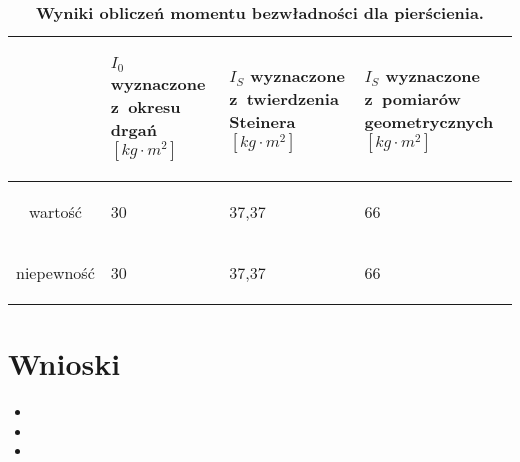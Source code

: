 \documentclass[a4paper,11pt]{article}
\begin{document}
\begin{table}[ht]
\centering
\caption{\textbf{Wyniki obliczeń momentu bezwładności dla pierścienia.}}
\begin{tabular}{|c|m{30mm}|m{30mm}|m{30mm}|}
\hline
& \begin{center}
\textbf{$I_{0}$ wyznaczone z~okresu drgań $[kg\cdot m^{2}]$}
\end{center} & \begin{center}
\textbf{$I_{S}$ wyznaczone z~twierdzenia Steinera $[kg\cdot m^{2}]$}
\end{center} & \begin{center}
\textbf{$I_{S}$ wyznaczone z~pomiarów geometrycznych $[kg\cdot m^{2}]$}
\end{center}  \\ \hline
wartość & \begin{center}30\end{center} & \begin{center}37,37\end{center} & \begin{center}66\end{center}\\ \hline
niepewność &\begin{center}30\end{center} & \begin{center}37,37\end{center} & \begin{center}66\end{center}\\ \hline

\end{tabular}
\end{table}



\section{Wnioski}
\begin{itemize}
\item 
\item 
\item  
\end{itemize}
\end{document}
